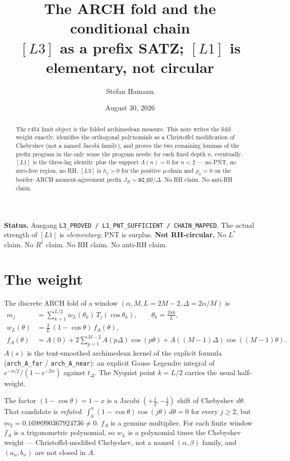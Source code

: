 \documentclass[11pt]{article}
\title{\bfseries The ARCH fold and the conditional chain\\[2mm]
\large $[L3]$ as a prefix SATZ; $[L1]$ is elementary, not circular}
\author{Stefan Hamann}
\date{August 30, 2026}
\begin{document}
\maketitle

\begin{abstract}\noindent
The r454 limit object is the folded
archimedean measure.
This note writes the fold weight exactly,
identifies the orthogonal polynomials as a
Christoffel modification of Chebyshev
(not a named Jacobi family), and proves the
two remaining lemmas of the prefix program
in the only sense the program needs:
for each fixed depth $n$, eventually.
$[L1]$ is the three-lag identity plus the
support $\Lambda(n)=0$ for $n<2$ --- no PNT,
no zero-free region, no RH.
$[L3]$ is $h_j>0$ for the positive
$\mu$-chain and $\rho_n=0$ on the
border--ARCH moment-agreement prefix
$J_B\sim \mathtt{BG\_DU}/\Delta$.
No RH claim.  No anti-RH claim.
\end{abstract}

\medskip\noindent
\textbf{Status.}\enspace
Ausgang
\texttt{L3\_PROVED / L1\_PNT\_SUFFICIENT / CHAIN\_MAPPED}.
The actual strength of $[L1]$ is
\emph{elementary}; PNT is surplus.
\textbf{Not RH-circular.}
No $L^{*}$ claim.  No $R^{\dagger}$ claim.
No RH claim.  No anti-RH claim.

\section{The weight}\label{sec:w}

The discrete ARCH fold of a window
$(\alpha,M,L=2M-2,\Delta=2\alpha/M)$ is
\begin{align}
m_j
&=\sum_{k=1}^{L/2} w_L(\theta_k)\,T_j(\cos\theta_k),
\qquad
\theta_k=\frac{2\pi k}{L},\label{eq:m}\\
w_L(\theta)
&=\frac{2}{L}\,(1-\cos\theta)\,f_A(\theta),\label{eq:w}\\
f_A(\theta)
&=A(0)+2\sum_{p=1}^{M-2}A(p\Delta)\cos(p\theta)
 +A((M-1)\Delta)\cos((M-1)\theta).\label{eq:f}
\end{align}
$A(s)$ is the tent-smoothed archimedean
kernel of the explicit formula
(\texttt{arch\_A\_far} / \texttt{arch\_A\_near}):
an explicit Gauss--Legendre integral of
$e^{-w/2}/(1-e^{-2w})$ against $t_\Delta$.
The Nyquist point $k=L/2$ carries the
usual half-weight.

The factor $(1-\cos\theta)=1-x$ is a
Jacobi $(+\tfrac12,-\tfrac12)$ shift of
Chebyshev $d\theta$.
That candidate is \emph{refuted}:
$\int_0^\pi(1-\cos\theta)\cos(j\theta)\,d\theta=0$
for every $j\ge 2$, but
$m_2=0.1698990367924736\neq 0$.
$f_A$ is a genuine multiplier.
For each finite window $f_A$ is a
trigonometric polynomial, so $w_L$ is a
polynomial times the Chebyshev weight ---
Christoffel-modified Chebyshev, not a
named $(\alpha,\beta)$ family, and
$(a_n,b_n)$ are not closed in $A$.
\end{document}
